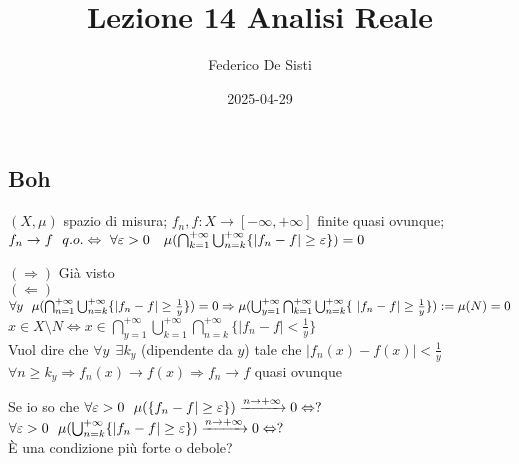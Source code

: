 \documentclass[12px]{article}
\title{Lezione 14 Analisi Reale}
\date{2025-04-29}
\author{Federico De Sisti}
\begin{document}
	\maketitle
	\newpage
	\subsection{Boh}
	\begin{prop}
		$(X,\mu)$ spazio di misura; $f_n, f: X \rightarrow[-\infty,+\infty]$ finite quasi ovunque; $f_n \rightarrow f \ \ q.o. \Leftrightarrow \ \forall \e>0\ \ \ \mu( \bigcap_{k=1}^{+\infty} \bigcup^{+\infty}_{n=k}\{|f_n-f|\geq \e\})=0$
	\end{prop}
	\begin{dimo}
		$ ( \Rightarrow )$ Già visto \\
		$( \Leftarrow)$  $\forall y \ \ \mu( \bigcap^{+\infty}_{n = 1} \bigcup^{+\infty}_{n=k}\{|f_n-f|\geq \frac 1y\}) = 0 \\\Rightarrow  \mu( \bigcup^{+\infty}_{y = 1} \bigcap^{+\infty}_{k =1} \bigcup^{+\infty}_{n = k}\{\ |f_n-f|\geq \frac 1y\}) := \mu(N) = 0$\\
		$x\in X\setminus N \Leftrightarrow x\in \bigcap^{+\infty}_{y = 1} \bigcup^{+\infty}_{k = 1} \bigcap^{+\infty}_{n=k}\{|f_n-f| <\frac 1y\}$\\
		Vuol dire che $\forall y \ \ \exists k_y$ (dipendente da  $y$) tale che $|f_n(x) -f(x)| < \frac 1y$\\
		 $\forall n\geq k_y \Rightarrow  f_n(x) \rightarrow f(x) \Rightarrow  f_n \rightarrow f$ quasi ovunque
	\end{dimo}
	Se io so che $\forall \e > 0 \ \ \mu(\{f_n-f|\geq\e\}) \xrightarrow{ n \rightarrow + \infty} 0 \Leftrightarrow ?$\\
	$\forall \varepsilon > 0 \ \ \mu( \bigcup^{+\infty}_{n=k}\{|f_n-f|\geq \varepsilon\}) \xrightarrow{n \rightarrow +\infty} 0 \Leftrightarrow ?$\\
	È una condizione più forte o debole?
	
\end{document}
